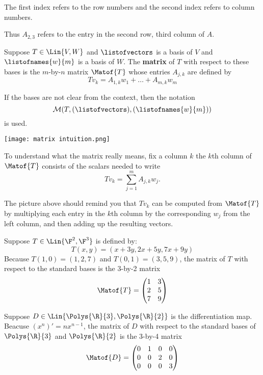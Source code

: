 The first index refers to the row numbers and the second index
refers to column numbers.

Thus $A_{2,3}$ refers to the entry in the second row, third column of $A$.

\begin{definition} 
   Suppose $T \in \Lin{V,W}$ and $\listofvectors$ is a basis of $V$ and
   $\listofnames{w}{m}$ is a basis of $W$. The \textbf{matrix} of $T$ with respect
   to these bases is the $m$-by-$n$ matrix $\Matof{T}$ whose entries
   $A_{j, k}$ are defined by
   \[ Tv_k = A_{1, k}w_1 + \dots + A_{m,k}w_m \]

   If the bases are not clear from the context, then the notation
   \[ \mathcal{M}(T, (\listofvectors), (\listofnames{w}{m})) \]
   is used.
\end{definition}

\texttt{[image: matrix intuition.png]}

To understand what the matrix really means, fix a column $k$
the $k$th column of $\Matof{T}$ consists of the scalars needed to write
\[ Tv_k = \sum_{j=1}^m A_{j,k}w_j.\]

The picture above should remind you that $Tv_k$ can be computed from
$\Matof{T}$ by multiplying each entry in the $k$th column by the corresponding
$w_j$ from the left column, and then adding up the resulting vectors.

\begin{example} [Matrices]
   Suppose $T \in \Lin{\F^2, \F^3}$ is defined by:
   \[ T(x,y) = (x+3y, 2x+5y, 7x+9y) \]
   Because $T(1, 0) = (1, 2, 7)$ and $T(0, 1) = (3, 5, 9)$, the matrix of
   $T$ with respect to the standard bases is the 3-by-2 matrix
   \[ \Matof{T} = \begin{pmatrix}
      1 & 3 \\
      2 & 5 \\
      7 & 9
   \end{pmatrix} \]

   Suppose $D \in \Lin{\Polys{\R}{3}, \Polys{\R}{2}}$ is the differentiation
   map. Beacuse $(x^n)' = nx^{n-1}$, the matrix of $D$ with respect
   to the standard bases of $\Polys{\R}{3}$ and $\Polys{\R}{2}$ is the
   3-by-4 matrix
   \[ \Matof{D} = \begin{pmatrix}
      0 & 1 & 0 & 0 \\
      0 & 0 & 2 & 0 \\
      0 & 0 & 0 & 3 \\
   \end{pmatrix}\]
\end{example}

